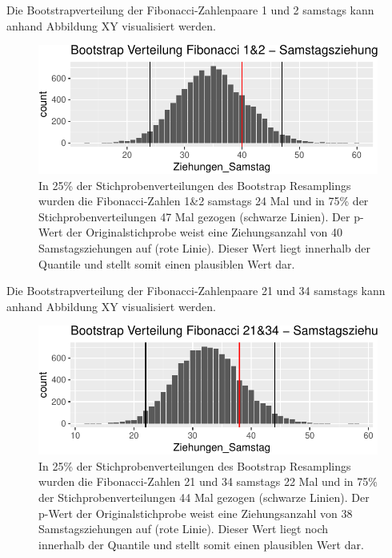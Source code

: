 \documentclass[ngerman,]{article}
\begin{document}
Die Bootstrapverteilung der Fibonacci-Zahlenpaare 1 und 2 samstags kann
anhand Abbildung XY visualisiert werden.

\begin{figure}

\includegraphics{Abbildung/Bootstrap_1_2sa-1} \hfill{}

\caption{In 25\% der Stichprobenverteilungen des Bootstrap Resamplings wurden die Fibonacci-Zahlen 1\&2 samstags 24 Mal und in 75\% der Stichprobenverteilungen 47 Mal gezogen (schwarze Linien). Der p-Wert der Originalstichprobe weist eine Ziehungsanzahl von 40 Samstagsziehungen auf (rote Linie). Dieser Wert liegt innerhalb der Quantile und stellt somit einen plausiblen Wert dar.}\label{fig:Bootstrap_1_2sa}
\end{figure}

Die Bootstrapverteilung der Fibonacci-Zahlenpaare 21 und 34 samstags
kann anhand Abbildung XY visualisiert werden.

\begin{figure}

\includegraphics{Abbildung/Bootstrap_21_34sa-1} \hfill{}

\caption{In 25\% der Stichprobenverteilungen des Bootstrap Resamplings wurden die Fibonacci-Zahlen 21 und 34 samstags 22 Mal und in 75\% der Stichprobenverteilungen 44 Mal gezogen (schwarze Linien). Der p-Wert der Originalstichprobe weist eine Ziehungsanzahl von 38 Samstagsziehungen auf (rote Linie). Dieser Wert liegt noch innerhalb der Quantile und stellt somit einen plausiblen Wert dar.}\label{fig:Bootstrap_21_34sa}
\end{figure}
\end{document}
